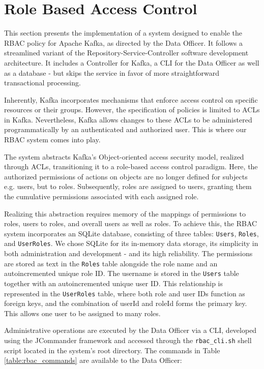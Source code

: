 \section{Role Based Access Control}
This section presents the implementation of a system designed to enable the \acf{RBAC} policy for Apache Kafka, as directed by the Data Officer. It follows a streamlined variant of the Repository-Service-Controller software development architecture. It includes a Controller for Kafka, a \ac{CLI} for the Data Officer as well as a database - but skips the service in favor of more straightforward transactional processing. \par
Inherently, Kafka incorporates mechanisms that enforce access control on specific resources or their groups. However, the specification of policies is limited to \acp{ACL} in Kafka. Nevertheless, Kafka allows changes to these \acp{ACL} to be administered programmatically by an authenticated and authorized user. This is where our \ac{RBAC} system comes into play. \par
The system abstracts Kafka's Object-oriented access security model, realized through \acp{ACL}, transitioning it to a role-based access control paradigm. Here, the authorized permissions of actions on objects are no longer defined for subjects e.g. users, but to roles. Subsequently, roles are assigned to users, granting them the cumulative permissions associated with each assigned role. \par
Realizing this abstraction requires memory of the mappings of permissions to roles, users to roles, and overall users as well as roles. To achieve this, the \ac{RBAC} system incorporates an SQLite \cite{sqlite} database, consisting of three tables: \texttt{Users}, \texttt{Roles}, and \texttt{UserRoles}. We chose SQLite for its in-memory data storage, its simplicity in both administration and development - and its high reliability. The permissions are stored as text in the \texttt{Roles} table alongside the role name and an autoincremented unique role ID. The username is stored in the \texttt{Users} table together with an autoincremented unique user ID. This relationship is represented in the \texttt{UserRoles} table, where both role and user IDs function as foreign keys, and the combination of userId and roleId forms the primary key. This allows one user to be assigned to many roles. \par
Administrative operations are executed by the Data Officer via a \ac{CLI}, developed using the JCommander framework \cite{jcommander} and accessed through the \texttt{rbac\_cli.sh} shell script located in the system's root directory. The commands in Table \ref{table:rbac_commands} are available to the Data Officer:

